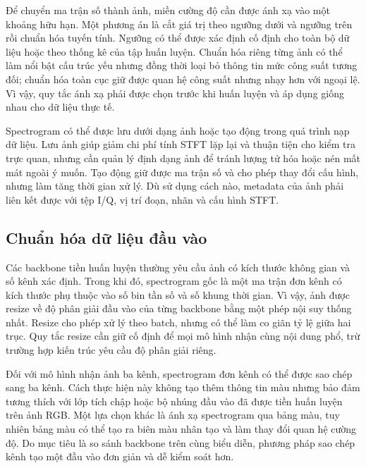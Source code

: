 \documentclass[../DoAn.tex]{subfiles}
\begin{document}

Để chuyển ma trận số thành ảnh, miền cường độ cần được ánh xạ vào một khoảng hữu hạn. Một phương án là cắt giá trị theo ngưỡng dưới và ngưỡng trên rồi chuẩn hóa tuyến tính. Ngưỡng có thể được xác định cố định cho toàn bộ dữ liệu hoặc theo thống kê của tập huấn luyện. Chuẩn hóa riêng từng ảnh có thể làm nổi bật cấu trúc yếu nhưng đồng thời loại bỏ thông tin mức công suất tương đối; chuẩn hóa toàn cục giữ được quan hệ công suất nhưng nhạy hơn với ngoại lệ. Vì vậy, quy tắc ánh xạ phải được chọn trước khi huấn luyện và áp dụng giống nhau cho dữ liệu thực tế.

Spectrogram có thể được lưu dưới dạng ảnh hoặc tạo động trong quá trình nạp dữ liệu. Lưu ảnh giúp giảm chi phí tính STFT lặp lại và thuận tiện cho kiểm tra trực quan, nhưng cần quản lý định dạng ảnh để tránh lượng tử hóa hoặc nén mất mát ngoài ý muốn. Tạo động giữ được ma trận số và cho phép thay đổi cấu hình, nhưng làm tăng thời gian xử lý. Dù sử dụng cách nào, metadata của ảnh phải liên kết được với tệp I/Q, vị trí đoạn, nhãn và cấu hình STFT.

\subsection{Chuẩn hóa dữ liệu đầu vào}

Các backbone tiền huấn luyện thường yêu cầu ảnh có kích thước không gian và số kênh xác định. Trong khi đó, spectrogram gốc là một ma trận đơn kênh có kích thước phụ thuộc vào số bin tần số và số khung thời gian. Vì vậy, ảnh được resize về độ phân giải đầu vào của từng backbone bằng một phép nội suy thống nhất. Resize cho phép xử lý theo batch, nhưng có thể làm co giãn tỷ lệ giữa hai trục. Quy tắc resize cần giữ cố định để mọi mô hình nhận cùng nội dung phổ, trừ trường hợp kiến trúc yêu cầu độ phân giải riêng.

Đối với mô hình nhận ảnh ba kênh, spectrogram đơn kênh có thể được sao chép sang ba kênh. Cách thực hiện này không tạo thêm thông tin màu nhưng bảo đảm tương thích với lớp tích chập hoặc bộ nhúng đầu vào đã được tiền huấn luyện trên ảnh RGB. Một lựa chọn khác là ánh xạ spectrogram qua bảng màu, tuy nhiên bảng màu có thể tạo ra biên màu nhân tạo và làm thay đổi quan hệ cường độ. Do mục tiêu là so sánh backbone trên cùng biểu diễn, phương pháp sao chép kênh tạo một đầu vào đơn giản và dễ kiểm soát hơn.
\end{document}
